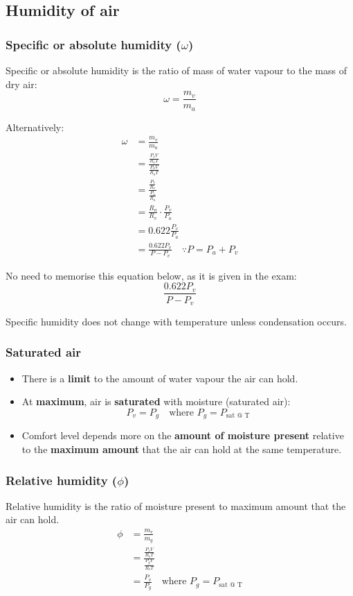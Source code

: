 \documentclass[11pt]{article}
\begin{document}
\subsection{Humidity of air}
\label{sec:orgb68fca7}

\subsubsection{Specific or absolute humidity (\(\omega\))}
\label{sec:org6e62d1a}
Specific or absolute humidity is the ratio of mass of water vapour to the mass of dry air:
\[\omega = \frac{m_v}{m_a}\]

Alternatively:
\begin{align*}
\omega &= \frac{m_v}{m_a} \\
&= \frac{\frac{P_v V}{R_v T}}{\frac{P_a V}{R_a T}} \\
&= \frac{\frac{P_v}{R_v}}{\frac{P_a}{R_a}} \\
&= \frac{R_a}{R_v} \cdot \frac{P_v}{P_a} \\
&= 0.622 \frac{P_v}{P_a} \\
&= \frac{0.622 P_v}{P - P_v} \quad \because P = P_a + P_v
\end{align*}

No need to memorise this equation below, as it is given in the exam:
\[\frac{0.622 P_v}{P - P_v}\]

Specific humidity does not change with temperature unless condensation occurs.
\subsubsection{Saturated air}
\label{sec:orgca734ea}
\begin{itemize}
\item There is a \textbf{limit} to the amount of water vapour the air can hold.
\item At \textbf{maximum}, air is \textbf{saturated} with moisture (saturated air):
\[P_v = P_g \quad \text{where } P_g = P_{\text{sat @ T}}\]
\item Comfort level depends more on the \textbf{amount of moisture present} relative to the \textbf{maximum amount} that the air can hold at the same temperature.
\end{itemize}
\subsubsection{Relative humidity (\(\phi\))}
\label{sec:org4db423b}
Relative humidity is the ratio of moisture present to maximum amount that the air can hold.
\begin{align*}
\phi &= \frac{m_v}{m_g} \\
&= \frac{\frac{P_v V}{R_v T}}{\frac{P_g V}{R_v T}} \\
&= \frac{P_v}{P_g} \quad \text{where } P_g = P_{\text{sat @ T}}
\end{align*}
\end{document}
